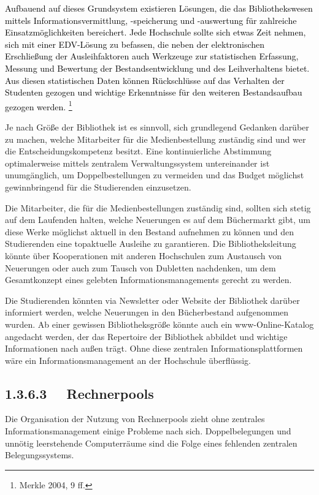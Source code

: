 \documentclass[a4paper]{article}
\begin{document}
\bigskip

{\sffamily
\textcolor{black}{Aufbauend auf dieses Grundsystem existieren Lösungen, die das Bibliothekswesen mittels
Informationsvermittlung, -speicherung und -auswertung }\textcolor{black}{für zahlreiche Einsatzmöglichkeiten
bereichert. Jede Hochschule sollte sich etwas Zeit nehmen, sich mit einer EDV-Lösung zu befassen, die neben der
elektronischen Erschließung der Ausleihfaktoren auch Werkzeuge zur statistischen Erfassung, Messung und Bewertung der
Bestandsentwicklung und des Leihverhaltens bietet. Aus diesen statistischen Daten können Rückschlüsse auf das Verhalten
der Studenten gezogen und wichtige Erkenntnisse für den weiteren Bestandsaufbau gezogen werden. }\footnote{Merkle 2004,
9 ff.}}


\bigskip

{\sffamily\color{black}
Je nach Größe der Bibliothek ist es sinnvoll, sich grundlegend Gedanken darüber zu machen, welche Mitarbeiter für die
Medienbestellung zuständig sind und wer die Entscheidungskompetenz besitzt. Eine kontinuierliche Abstimmung
optimalerweise mittels zentralem Verwaltungssystem untereinander ist unumgänglich, um Doppelbestellungen zu vermeiden
und das Budget möglichst gewinnbringend für die Studierenden einzusetzen. }


\bigskip

{\sffamily\color{black}
Die Mitarbeiter, die für die Medienbestellungen zuständig sind, sollten sich stetig auf dem Laufenden halten, welche
Neuerungen es auf dem Büchermarkt gibt, um diese Werke möglichst aktuell in den Bestand aufnehmen zu können und den
Studierenden eine topaktuelle Ausleihe zu garantieren. Die Bibliotheksleitung könnte über Kooperationen mit anderen
Hochschulen zum Austausch von Neuerungen oder auch zum Tausch von Dubletten nachdenken, um dem Gesamtkonzept eines
gelebten Informationsmanagements gerecht zu werden. }


\bigskip

{\sffamily\color{black}
Die Studierenden könnten via Newsletter oder Website der Bibliothek darüber informiert werden, welche Neuerungen in den
Bücherbestand aufgenommen wurden. Ab einer gewissen Bibliotheksgröße könnte auch ein www-Online-Katalog angedacht
werden, der das Repertoire der Bibliothek abbildet und wichtige Informationen nach außen trägt. Ohne diese zentralen
Informationsplattformen wäre ein Informationsmanagement an der Hochschule überflüssig. }

\subsection[1.3.6.3 \ \ Rechnerpools]{\color{black} 1.3.6.3 \ \ Rechnerpools}
{\sffamily\color{black}
Die Organisation der Nutzung von Rechnerpools zieht ohne zentrales Informationsmanagement einige Probleme nach sich.
Doppelbelegungen und unnötig leerstehende Computerräume sind die Folge eines fehlenden zentralen Belegungssystems. }
\end{document}

